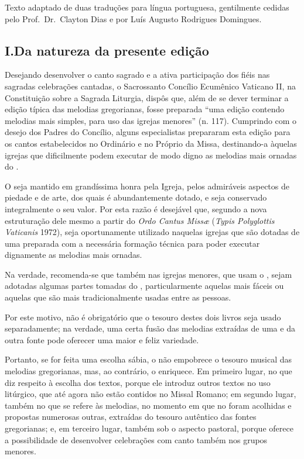 \label{section:praenotanda}

\begin{center}
  \begin{rubrica}
    Texto adaptado de duas traduções para língua portuguesa, gentilmente cedidas pelo Prof.\ Dr.\ Clayton Dias e por Luís Augusto Rodrigues Domingues.
  \end{rubrica}
\end{center}

\subsection{I.\@ Da natureza da presente edição}\label{subsection:praenotanda-1}

 Desejando desenvolver o canto sagrado e a ativa participação dos fiéis nas sagradas celebrações cantadas, o Sacrossanto Concílio Ecumênico Vaticano II, na Constituição sobre a Sagrada Liturgia, dispôs que, além de se dever terminar a edição típica das melodias gregorianas, fosse preparada ``uma edição contendo melodias mais simples, para uso das igrejas menores'' (n. 117). Cumprindo com o desejo dos Padres do Concílio, alguns especialistas prepararam esta edição para os cantos estabelecidos no  Ordinário e no Próprio da Missa, destinando-a àquelas igrejas que dificilmente podem executar de modo digno as melodias mais ornadas do {\GR}.

 O {\GR} seja mantido em grandíssima honra pela Igreja, pelos admiráveis aspectos de piedade e de arte, dos quais é abundantemente dotado, e seja conservado integralmente o seu valor. Por esta razão é desejável que, segundo a nova estruturação dele mesmo a partir do \emph{Ordo Cantus Missæ} (\emph{Typis Polyglottis Vaticanis} 1972), seja oportunamente utilizado naquelas igrejas que são dotadas de uma {\ScholaC} preparada com a necessária formação técnica para poder executar dignamente as melodias mais ornadas.

Na verdade, recomenda-se que também nas igrejas menores, que usam o {\GS}, sejam  adotadas algumas partes tomadas do {\GR}, particularmente aquelas mais fáceis ou aquelas que são mais tradicionalmente usadas entre as pessoas.

 Por este motivo, não é obrigatório que o tesouro destes dois livros seja usado separadamente; na verdade, uma certa fusão das melodias extraídas de uma e da outra fonte pode oferecer uma maior e feliz variedade.

 Portanto, se for feita uma escolha sábia, o {\GS} não empobrece o tesouro musical das melodias gregorianas, mas, ao contrário, o enriquece. Em primeiro lugar, no que diz respeito à escolha dos textos, porque ele introduz outros textos no uso litúrgico, que até agora não estão contidos no Missal Romano; em segundo lugar, também no que se refere às melodias, no momento em que no {\GS} foram acolhidas e propostas numerosas outras, extraídas do tesouro autêntico das fontes gregorianas; e, em terceiro lugar, também sob o aspecto pastoral, porque oferece a possibilidade de desenvolver celebrações com canto também nos grupos menores.

